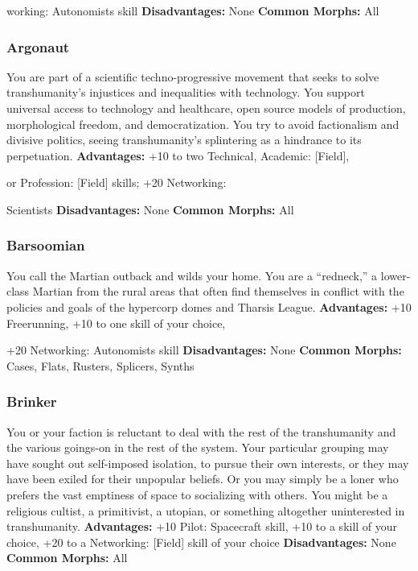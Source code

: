 working: Autonomists skill
\textbf{Disadvantages:} None
\textbf{Common Morphs:} All

\subsubsection{Argonaut}

You are part of a scientific techno-progressive movement
that seeks to solve transhumanity's injustices and
inequalities with technology. You support universal 
access to technology and healthcare, open source 
models of production, morphological freedom, and 
democratization. You try to avoid factionalism and 
divisive politics, seeing transhumanity's splintering as 
a hindrance to its perpetuation.
\textbf{Advantages:} +10 to two Technical, Academic: [Field], 

or Profession: [Field] skills; +20 Networking: 

Scientists
\textbf{Disadvantages:} None
\textbf{Common Morphs:} All

\subsubsection{Barsoomian}

You call the Martian outback and wilds your home. 
You are a ``redneck,'' a lower-class Martian from the 
rural areas that often find themselves in conflict with 
the policies and goals of the hypercorp domes and 
Tharsis League.
\textbf{Advantages:} +10 Freerunning, +10 to one skill of your choice, 

+20 Networking: Autonomists skill
\textbf{Disadvantages:} None
\textbf{Common Morphs:} Cases, Flats, Rusters, Splicers, Synths

\subsubsection{Brinker}

You or your faction is reluctant to deal with the rest of the 
transhumanity and the various goings-on in the rest of the 
system. Your particular grouping may have sought out self-imposed
isolation, to pursue their own interests, or they may
have been exiled for their unpopular beliefs. Or you may 
simply be a loner who prefers the vast emptiness of space 
to socializing with others. You might be a religious cultist, a 
primitivist, a utopian, or something altogether uninterested 
in transhumanity.
\textbf{Advantages: }+10 Pilot: Spacecraft skill, +10 to a skill of your 
choice, +20 to a Networking: [Field] skill of your choice
\textbf{Disadvantages:} None
\textbf{Common Morphs:} All

